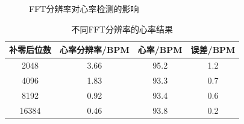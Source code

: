 \documentclass[12pt, a4paper, oneside]{ctexart}
\begin{document}
      \begin{figure}[H]
        \centering
        \caption{FFT分辨率对心率检测的影响}
        \label{fig:twopicture} 

      \end{figure}

      \begin{table}[!h]
        \renewcommand{\arraystretch}{1.3}
        \caption{不同FFT分辨率的心率结果}
        \centering 
        \begin{tabular}{cccc}
            \toprule
            补零后位数 & 心率分辨率/BPM & 心率/BPM & 误差/BPM  \\
            \midrule
            2048 & 3.66 & 95.2 & 1.2 \\
            4096 & 1.83 & 93.3 & 0.7\\
            8192 & 0.92 & 93.4 & 0.6\\
            16384 & 0.46 & 93.8  & 0.2\\
            \bottomrule
        \end{tabular}
    \end{table}
\end{document}
